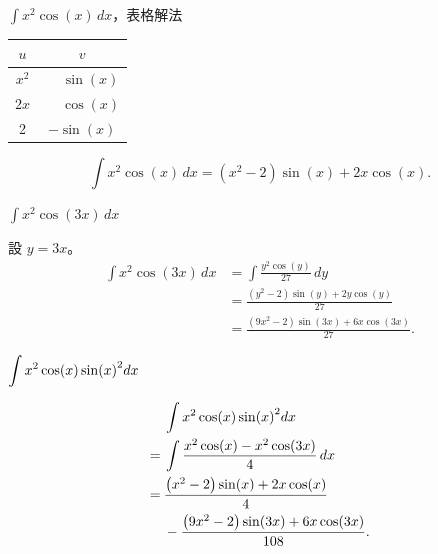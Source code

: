 \documentclass{beamer}
\newcommand{\Left} {\mathopen{}\mathclose\bgroup\left}
\newcommand{\Right}{\aftergroup\egroup\right}
\theoremstyle{remark}
\begin{document}
\begin{CJK}{UTF8}{bsmi}
\begin{frame}{$\displaystyle \int x^2 \cos(x)\,dx$，表格解法}
  \begin{solution}
    \begin{center}
      \begin{tabular}{cc}
	$u$  & $v$\\
	\hline
	$x^2$& $\phantom+\sin(x)$\\
	$2x$ & $\phantom+\cos(x)$\\
	2    & $        -\sin(x)$
      \end{tabular}
    \end{center}
    \[\int x^2 \cos(x)\,dx = \left( x^2 - 2 \right) \sin(x) + 2x \cos(x).\]
  \end{solution}
\end{frame}

\begin{frame}{$\displaystyle \int x^2 \cos(3x)\,dx$}
  \begin{solution}
    設 $y = 3x$。
    \begin{align*}
      \int x^2 \cos(3x)\,dx &= \int \frac{y^2 \cos(y)}{27}\,dy\\
	&= \frac{\left( y^2 - 2 \right) \sin(y) + 2y \cos(y)}{27}\\
	&= \frac{\left( 9x^2 - 2 \right) \sin(3x) + 6x \cos(3x)}{27}.
    \end{align*}
  \end{solution}
\end{frame}

\begin{frame}{$\displaystyle \int x^2 \cos(x) \sin \Left( x \Right)^2 dx$}
  \begin{solution}
    \begin{align*}
	 & \int x^2 \cos(x) \sin \Left( x \Right)^2 dx\\
      =\:& \int \frac{x^2 \cos(x) - x^2 \cos(3x)}{4}\,dx\\
      =\:& \frac{\left( x^2 - 2 \right) \sin(x) + 2x \cos(x)}{4}\\
      \phantom=\:& -\frac{\left( 9x^2 - 2 \right) \sin(3x) + 6x \cos(3x)}{108}.
    \end{align*}
  \end{solution}
\end{frame}


\end{CJK}
\end{document}
